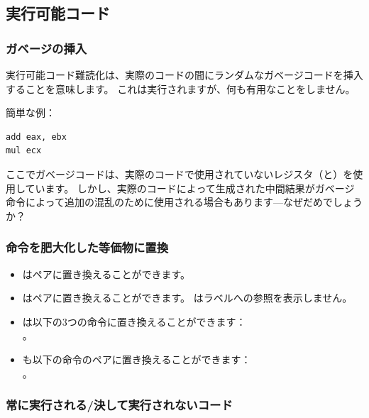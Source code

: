 \subsection{実行可能コード}

\subsubsection{ガベージの挿入}

実行可能コード難読化は、実際のコードの間にランダムなガベージコードを挿入することを意味します。
これは実行されますが、何も有用なことをしません。

簡単な例：

\begin{lstlisting}[caption=元のコード,style=customasmx86]
add	eax, ebx
mul	ecx
\end{lstlisting}



ここでガベージコードは、実際のコードで使用されていないレジスタ（と）を使用しています。
しかし、実際のコードによって生成された中間結果がガベージ命令によって追加の混乱のために使用される場合もあります---なぜだめでしょうか？

\subsubsection{命令を肥大化した等価物に置換}

\begin{itemize}
\item {}はペアに置き換えることができます。
\item {}はペアに置き換えることができます。
\IDA{}はラベルへの参照を表示しません。
\item {}は以下の3つの命令に置き換えることができます：\\
。
\item {}も以下の命令のペアに置き換えることができます：\\
。%

\end{itemize}

\subsubsection{常に実行される/決して実行されないコード}

